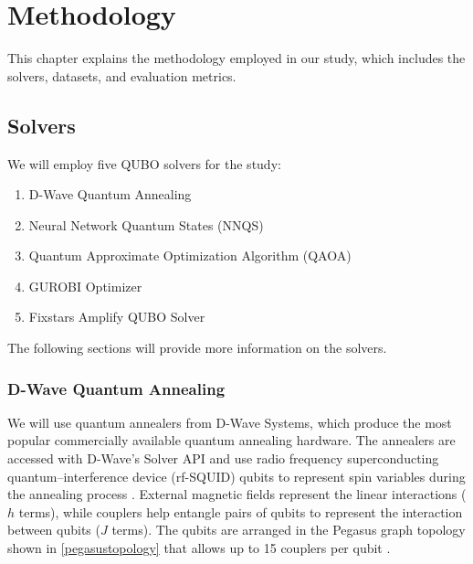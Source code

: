 
\chapter{Methodology}
\label{methodology}
This chapter explains the methodology employed in our study, which includes the solvers, datasets, and evaluation metrics.

\section{Solvers}
We will employ five QUBO solvers for the study:
\begin{enumerate}
    \item D-Wave Quantum Annealing
    \item Neural Network Quantum States (NNQS)
    \item Quantum Approximate Optimization Algorithm (QAOA)
    \item GUROBI Optimizer
    \item Fixstars Amplify QUBO Solver
\end{enumerate}
The following sections will provide more information on the solvers.

\subsection{D-Wave Quantum Annealing}
We will use quantum annealers from D-Wave Systems, which produce the most popular commercially available quantum annealing hardware. The annealers are accessed with D-Wave's Solver API and use radio frequency superconducting quantum–interference device (rf-SQUID) qubits to represent spin variables during the annealing process \cite{b14}. External magnetic fields represent the linear interactions ($h$ terms), while couplers help entangle pairs of qubits to represent the interaction between qubits ($J$ terms). The qubits are arranged in the Pegasus graph topology shown in \autoref{pegasustopology} that allows up to 15 couplers per qubit \cite{b14}. 

